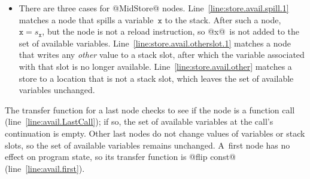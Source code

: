 \documentclass[blockstyle,preprint,natbib,nocopyrightspace]{sigplanconf}
\newcommand\lineref[1]{line~\ref{line:#1}}
\newcommand\Lineref[1]{Line~\ref{line:#1}}
\newcommand\slotof[1]{\ensuremath{s_{#1}}}
\let\slotOf=\slotof
\def\authornote#1{\unskip\relax}
\newcommand{\simon}[1]{\authornote{SLPJ: #1}}
\newcommand{\norman}[1]{\authornote{NR: #1}}
\let\remark\norman
\newcommand{\john}[1]{\authornote{JD: #1}}
\begin{document}
\begin{itemize}
\item 
There are three cases for @MidStore@ nodes.
\Lineref{store.avail.spill.1}
matches a node that spills a variable~$\mathtt{x}$ to the stack.
After such a node, $\mathtt{x} = \slotOf {\mathtt{x}}$,
but the node is not a reload instruction,
so @x@~is not added to the set of available variables.
%
\Lineref{store.avail.otherslot.1}
matches a node that writes any \emph{other} value to a stack slot,
after which the variable associated with that slot is no longer available.
%
\Lineref{store.avail.other} matches a store to a location that is not
a stack slot, which leaves the set of available variables unchanged.
\end{itemize}


The transfer function for a last node checks to see if the node is a
function call (\lineref{avail.LastCall}); if so, the set of
available variables at the call's continuation is empty.
Other last nodes do not change values of variables or stack slots, 
so the set of available variables remains unchanged.
%
A~first node has no effect on program state, so its transfer function
is @flip const@ (\lineref{avail.first}).
\end{document}
